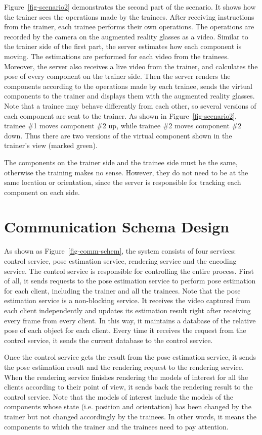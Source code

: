 Figure~\ref{fig-scenario2} demonstrates the second part of the scenario. It shows how the trainer sees the operations made by the trainees.
After receiving instructions from the trainer, each trainee performs their own operations. The operations are recorded by the camera on the augmented reality glasses as a video.
Similar to the trainer side of the first part, the server estimates how each component is moving. The estimations are performed for each video from the trainees.
Moreover, the server also receives a live video from the trainer, and calculates the pose of every component on the trainer side.
Then the server renders the components according to the operations made by each trainee, sends the virtual components to the trainer and displays them with the augmented reality glasses.
Note that a trainee may behave differently from each other, so several versions of each component are sent to the trainer. As shown in Figure~\ref{fig-scenario2}, trainee \#1 moves component \#2 up, while trainee \#2 moves component \#2 down. Thus there are two versions of the virtual component shown in the trainer's view (marked green).

The components on the trainer side and the trainee side must be the same, otherwise the training makes no sense. However, they do not need to be at the same location or orientation, since the server is responsible for tracking each component on each side.

\section{Communication Schema Design}

As shown as Figure~\ref{fig-comm-schem}, the system consists of four services: control service, pose estimation service, rendering service and the encoding service.
The control service is responsible for controlling the entire process.
First of all, it sends requests to the pose estimation service to perform pose estimation for each client, including the trainer and all the trainees.
Note that the pose estimation service is a non-blocking service. It receives the video captured from each client independently and updates its estimation result right after receiving every frame from every client. In this way, it maintains a database of the relative pose of each object for each client. Every time it receives the request from the control service, it sends the current database to the control service.

Once the control service gets the result from the pose estimation service, it sends the pose estimation result and the rendering request to the rendering service.
When the rendering service finishes rendering the models of interest for all the clients according to their point of view, it sends back the rendering result to the control service.
Note that the models of interest include the models of the components whose state (i.e. position and orientation) has been changed by the trainer but not changed accordingly by the trainees. In other words, it means the components to which the trainer and the trainees need to pay attention.

